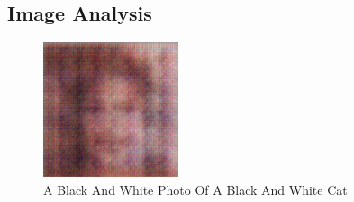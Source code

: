 \documentclass{article}%
\begin{document}
%
\subsection{Image Analysis}%
\label{subsec:ImageAnalysis}%


\begin{figure}[h!]%
\centering%
\includegraphics[width=150px]{500_fake_images/samples_5_102.png}%
\caption{A Black And White Photo Of A Black And White Cat}%
\end{figure}

%
\end{document}
